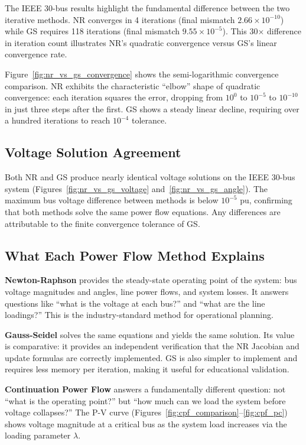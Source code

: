 \documentclass[12pt,a4paper]{article}
\begin{document}
The IEEE 30-bus results highlight the fundamental difference between the two iterative methods. NR converges in 4 iterations (final mismatch $2.66\times10^{-10}$) while GS requires 118 iterations (final mismatch $9.55\times10^{-5}$). This 30$\times$ difference in iteration count illustrates NR's quadratic convergence versus GS's linear convergence rate.

Figure~\ref{fig:nr_vs_gs_convergence} shows the semi-logarithmic convergence comparison. NR exhibits the characteristic ``elbow'' shape of quadratic convergence: each iteration squares the error, dropping from $10^{0}$ to $10^{-5}$ to $10^{-10}$ in just three steps after the first. GS shows a steady linear decline, requiring over a hundred iterations to reach $10^{-4}$ tolerance.

\subsection{Voltage Solution Agreement}

Both NR and GS produce nearly identical voltage solutions on the IEEE 30-bus system (Figures~\ref{fig:nr_vs_gs_voltage} and~\ref{fig:nr_vs_gs_angle}). The maximum bus voltage difference between methods is below $10^{-5}$ pu, confirming that both methods solve the same power flow equations. Any differences are attributable to the finite convergence tolerance of GS.

\subsection{What Each Power Flow Method Explains}

\textbf{Newton-Raphson} provides the steady-state operating point of the system: bus voltage magnitudes and angles, line power flows, and system losses. It answers questions like ``what is the voltage at each bus?'' and ``what are the line loadings?'' This is the industry-standard method for operational planning.

\textbf{Gauss-Seidel} solves the same equations and yields the same solution. Its value is comparative: it provides an independent verification that the NR Jacobian and update formulas are correctly implemented. GS is also simpler to implement and requires less memory per iteration, making it useful for educational validation.

\textbf{Continuation Power Flow} answers a fundamentally different question: not ``what is the operating point?'' but ``how much can we load the system before voltage collapses?'' The P-V curve (Figures~\ref{fig:cpf_comparison}--\ref{fig:cpf_pc}) shows voltage magnitude at a critical bus as the system load increases via the loading parameter $\lambda$.
\end{document}
